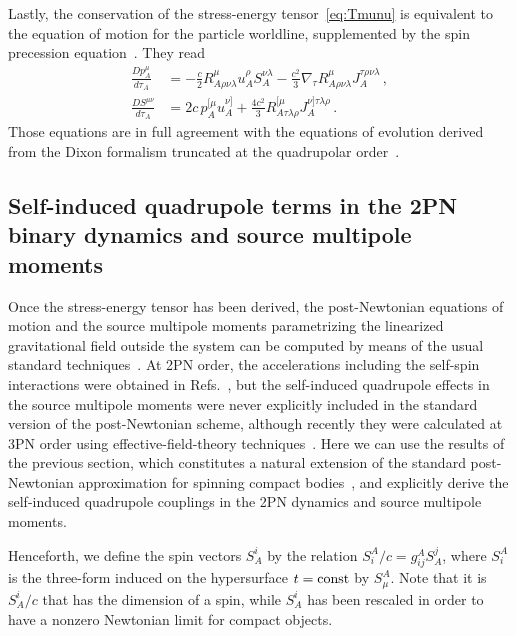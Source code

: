 \documentclass[aps, prd,
twocolumn,%
superscriptaddress,
showpacs, nofootinbib, eqsecnum, amsmath, amssymb, floatfix
]{revtex4}
\begin{document}
Lastly, the conservation of the stress-energy tensor~\eqref{eq:Tmunu} is
equivalent to the equation of motion for the particle worldline, supplemented
by the spin precession equation~\cite{SP10}. They read
%
\begin{subequations}
\begin{align}  \label{eq:Dixon_EOM}
\frac{D p_A^\mu}{d\tau_A} &= - \frac{c}{2} R^\mu_{A\rho\nu\lambda} u_A^\rho
S^{\nu \lambda}_A - \frac{c^2}{3} \nabla_\tau  R^\mu_{A\rho\nu\lambda}
J_A^{\tau\rho\nu\lambda} \, , \\ \label{eq:Dixon_precession}
\frac{DS^{\mu\nu}}{d\tau_A} &= 2 c \, p_A^{[\mu} u_A^{\nu]} + \frac{4c^2}{3}
R^{[\mu}_{A\tau\lambda\rho} J_A^{\nu]\tau\lambda\rho} \, .
\end{align}
\end{subequations}
%
Those equations are in full agreement with the equations of evolution derived
from the Dixon formalism truncated at the quadrupolar order~\cite{Dixon1974}.

\subsection{Self-induced quadrupole terms in the 2PN binary dynamics and
source multipole moments}

Once the stress-energy tensor has been derived, the post-Newtonian equations
of motion and the source multipole moments parametrizing the linearized
gravitational field outside the system can be computed by means of the usual
standard techniques~\cite{Blanchet2006}. At 2PN order, the accelerations
including the self-spin interactions were obtained in
Refs.~\cite{Poisson:1997ha,Damour01c}, but the self-induced quadrupole effects
in the source multipole moments were never explicitly included in the standard
version of the post-Newtonian scheme, although recently they were calculated
at 3PN order using effective-field-theory techniques~\cite{Porto:2010zg}. Here
we can use the results of the previous section, which constitutes a natural
extension of the standard post-Newtonian approximation for spinning compact
bodies~\cite{Faye-Blanchet-Buonanno:2006}, and explicitly derive the
self-induced quadrupole couplings in the 2PN dynamics and source multipole
moments.

Henceforth, we define the spin vectors $S_A^i$ by the relation
$S_i^A/c = g_{ij}^A S_A^j$, where $S_i^A$ is the three-form induced
on the hypersurface $t= {\rm const}$ by $S_\mu^A$. Note that it is
$S^i_A/c$ that has the dimension of a spin, while $S^i_A$ has been
rescaled in order to have a nonzero Newtonian limit for compact
objects.
\end{document}
